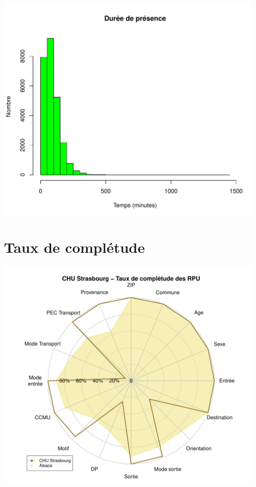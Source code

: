 \documentclass[12pt,english,french,twoside]{book}\usepackage[]{graphicx}\usepackage[]{color}
\makeatletter
\def\maxwidth{ %
  \ifdim\Gin@nat@width>\linewidth
    \linewidth
  \else
    \Gin@nat@width
  \fi
}
\newenvironment{knitrout}{}{} %
\makeatother
\begin{document}
\begin{knitrout}
\color{fgcolor}
\includegraphics[width=\maxwidth]{figure/graphe_hus-1} 

\end{knitrout}

\section*{Taux de complétude}

\begin{knitrout}
\color{fgcolor}
\includegraphics[width=\maxwidth]{figure/compl_hus-1} 

\end{knitrout}
\end{document}
